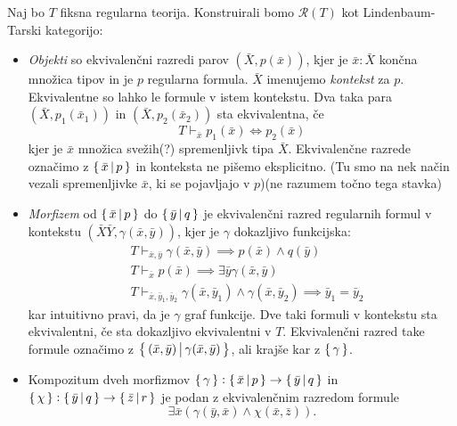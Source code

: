 \documentclass[../kategoricna_logika.tex]{subfiles}
\begin{document}
\begin{definicija}
  Naj bo $T$ fiksna regularna teorija. Konstruirali bomo $\mathcal{R}(T)$ kot Lindenbaum-Tarski kategorijo:
  \begin{itemize}
    \item \emph{Objekti} so ekvivalenčni razredi parov $(\bar{X}, p(\bar{x}))$,
      kjer je $\bar{x} : \bar{X}$ končna množica tipov in je $p$ regularna formula.
      $\bar{X}$ imenujemo \emph{kontekst} za $p$. Ekvivalentne so lahko le formule v istem kontekstu.
      Dva taka para $(\bar{X}, p_1(\bar{x}_1))$ in $(\bar{X}, p_2(\bar{x}_2))$ sta ekvivalentna, če
      $$T \vdash_{\bar{x}} p_1(\bar{x}) \Leftrightarrow p_2(\bar{x})$$
      kjer je $\bar{x}$ množica svežih(?) spremenljivk tipa $\bar{X}$.
      Ekvivalenčne razrede označimo z $\left\lbrace\,\bar{x} \,\middle|\, p\,\right\rbrace$ in konteksta ne pišemo eksplicitno.
      (Tu smo na nek način vezali spremenljivke $\bar{x}$, ki se pojavljajo v $p$)(ne razumem točno tega stavka)
    \item \emph{Morfizem} od $\left\lbrace\,\bar{x} \,\middle|\, p\,\right\rbrace$ do $\left\lbrace\,\bar{y} \,\middle|\, q\,\right\rbrace$
      je ekvivalenčni razred regularnih formul v kontekstu $(\bar{X}\bar{Y}, \gamma(\bar{x},\bar{y}))$,
      kjer je $\gamma$ dokazljivo funkcijska:
      \begin{align*}
        &T \vdash_{\bar{x},\bar{y}} \gamma(\bar{x},\bar{y})  \implies p(\bar{x}) \wedge q(\bar{y}) \\
        &T \vdash_{\bar{x}} p(\bar{x}) \implies \exists \bar{y} \gamma(\bar{x},\bar{y}) \\
        &T \vdash_{\bar{x},\bar{y}_1,\bar{y}_2} \gamma(\bar{x},\bar{y}_1) \wedge \gamma(\bar{x},\bar{y}_2) \implies \bar{y}_1 = \bar{y}_2
      \end{align*}
      kar intuitivno pravi, da je $\gamma$ graf funkcije.
      Dve taki formuli v kontekstu sta ekvivalentni, če sta dokazljivo ekvivalentni v $T$.
      Ekvivalenčni razred take formule označimo z
      $\left\lbrace\,(\bar{x},\bar{y}) \,\middle|\, \gamma(\bar{x},\bar{y})\,\right\rbrace$,
      ali krajše kar z $\left\lbrace\,\gamma\,\right\rbrace$.
    \item Kompozitum dveh morfizmov
      $\left\lbrace\,\gamma\,\right\rbrace : \left\lbrace\,\bar{x} \,\middle|\, p\,\right\rbrace \to \left\lbrace\,\bar{y} \,\middle|\, q\,\right\rbrace$ in
      $\left\lbrace\,\chi\,\right\rbrace : \left\lbrace\,\bar{y}\,\middle|\, q\,\right\rbrace \to \left\lbrace\,\bar{z}\,\middle|\, r\,\right\rbrace$
      je podan z ekvivalenčnim razredom formule
      $$\exists \bar{x}(\gamma(\bar{y},\bar{x}) \wedge \chi(\bar{x},\bar{z})).$$
  \end{itemize}
\end{definicija}
\end{document}
